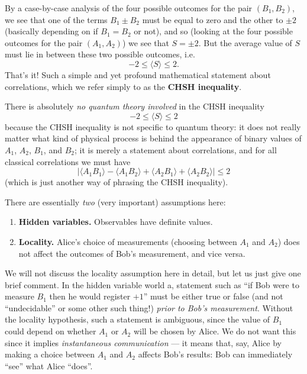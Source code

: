 \documentclass[fleqn,a4paper]{article}
\providecommand{\tightlist}{\setlength{\itemsep}{0pt}\setlength{\parskip}{0pt}}
\newenvironment{idea}{\everypar{\setlength{\parindent}{1.5em}}}{}
\theoremstyle{definition}
\theoremstyle{definition}
\theoremstyle{definition}
\theoremstyle{definition}
\theoremstyle{remark}
\begin{document}
By a case-by-case analysis of the four possible outcomes for the pair \((B_1,B_2)\), we see that one of the terms \(B_1\pm B_2\) must be equal to zero and the other to \(\pm 2\) (basically depending on if \(B_1=B_2\) or not), and so (looking at the four possible outcomes for the pair \((A_1,A_2)\)) we see that \(S=\pm2\).
But the average value of \(S\) must lie in between these two possible outcomes, i.e.
\[
  -2 \leqslant\langle S\rangle \leqslant 2.
\]
That's it!
Such a simple and yet profound mathematical statement about correlations, which we refer simply to as the \textbf{CHSH inequality}.

\begin{idea}
There is absolutely \emph{no quantum theory involved} in the CHSH inequality
\[
  -2 \leqslant\langle S\rangle \leqslant 2
\]
because the CHSH inequality is not specific to quantum theory: it does not really matter what kind of physical process is behind the appearance of binary values of \(A_1\), \(A_2\), \(B_1\), and \(B_2\); it is merely a statement about correlations, and for all classical correlations we must have
\[
  |
    \langle A_1 B_1\rangle - \langle A_1 B_2\rangle + \langle A_2 B_1\rangle + \langle A_2 B_2\rangle
  | \leqslant 2
\]
(which is just another way of phrasing the CHSH inequality).

\end{idea}

There are essentially \emph{two} (very important) assumptions here:

\begin{enumerate}
\def\labelenumi{\arabic{enumi}.}
\tightlist
\item
  \textbf{Hidden variables.} Observables have definite values.
\item
  \textbf{Locality.} Alice's choice of measurements (choosing between \(A_1\) and \(A_2\)) does not affect the outcomes of Bob's measurement, and vice versa.
\end{enumerate}

We will not discuss the locality assumption here in detail, but let us just give one brief comment.
In the hidden variable world a, statement such as ``if Bob were to measure \(B_1\) then he would register \(+1\)'' must be either true or false (and not ``undecidable'' or some other such thing!) \emph{prior to Bob's measurement}.
Without the locality hypothesis, such a statement is ambiguous, since the value of \(B_1\) could depend on whether \(A_1\) or \(A_2\) will be chosen by Alice.
We do not want this since it implies \emph{instantaneous communication} --- it means that, say, Alice by making a choice between \(A_1\) and \(A_2\) affects Bob's results: Bob can immediately ``see'' what Alice ``does''.
\end{document}
